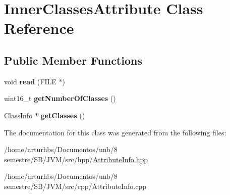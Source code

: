 \hypertarget{classInnerClassesAttribute}{}\section{Inner\+Classes\+Attribute Class Reference}
\label{classInnerClassesAttribute}
\subsection*{Public Member Functions}
\begin{DoxyCompactItemize}
\item 
void {\bfseries read} (F\+I\+LE $\ast$)\hypertarget{classInnerClassesAttribute_ae43a7123a6838f72aebd1b0a829bfb3d}{}\label{classInnerClassesAttribute_ae43a7123a6838f72aebd1b0a829bfb3d}

\item 
uint16\+\_\+t {\bfseries get\+Number\+Of\+Classes} ()\hypertarget{classInnerClassesAttribute_ad22800b6d8b252ee045c438258549570}{}\label{classInnerClassesAttribute_ad22800b6d8b252ee045c438258549570}

\item 
\hyperlink{classClassInfo}{Class\+Info} $\ast$ {\bfseries get\+Classes} ()\hypertarget{classInnerClassesAttribute_a9e5d2a9b9304e72f532ef6033dac8eea}{}\label{classInnerClassesAttribute_a9e5d2a9b9304e72f532ef6033dac8eea}

\end{DoxyCompactItemize}


The documentation for this class was generated from the following files\+:\begin{DoxyCompactItemize}
\item 
/home/arturhbs/\+Documentos/unb/8 semestre/\+S\+B/\+J\+V\+M/src/hpp/\hyperlink{AttributeInfo_8hpp}{Attribute\+Info.\+hpp}\item 
/home/arturhbs/\+Documentos/unb/8 semestre/\+S\+B/\+J\+V\+M/src/cpp/Attribute\+Info.\+cpp\end{DoxyCompactItemize}
